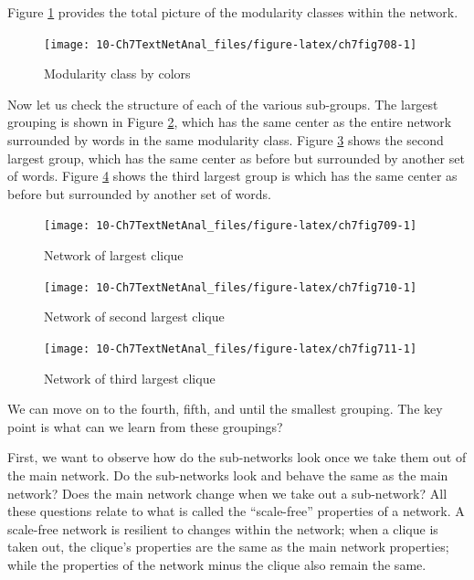 \documentclass[
]{article}
\begin{document}
Figure \ref{fig:ch7fig708} provides the total picture of the modularity classes within the network.

\begin{figure}

{\centering \texttt{[image: 10-Ch7TextNetAnal\_files/figure-latex/ch7fig708-1]} 

}

\caption{Modularity class by colors}\label{fig:ch7fig708}
\end{figure}

Now let us check the structure of each of the various sub-groups. The largest grouping is shown in Figure \ref{fig:ch7fig709}, which has the same center as the entire network surrounded by words in the same modularity class. Figure \ref{fig:ch7fig710} shows the second largest group, which has the same center as before but surrounded by another set of words. Figure \ref{fig:ch7fig711} shows the third largest group is which has the same center as before but surrounded by another set of words.

\begin{figure}

{\centering \texttt{[image: 10-Ch7TextNetAnal\_files/figure-latex/ch7fig709-1]} 

}

\caption{Network of largest clique}\label{fig:ch7fig709}
\end{figure}

\begin{figure}

{\centering \texttt{[image: 10-Ch7TextNetAnal\_files/figure-latex/ch7fig710-1]} 

}

\caption{Network of second largest clique}\label{fig:ch7fig710}
\end{figure}

\begin{figure}

{\centering \texttt{[image: 10-Ch7TextNetAnal\_files/figure-latex/ch7fig711-1]} 

}

\caption{Network of third largest clique}\label{fig:ch7fig711}
\end{figure}

We can move on to the fourth, fifth, and until the smallest grouping. The key point is what can we learn from these groupings?

First, we want to observe how do the sub-networks look once we take them out of the main network. Do the sub-networks look and behave the same as the main network? Does the main network change when we take out a sub-network? All these questions relate to what is called the ``scale-free'' properties of a network. A scale-free network is resilient to changes within the network; when a clique is taken out, the clique's properties are the same as the main network properties; while the properties of the network minus the clique also remain the same.
\end{document}
